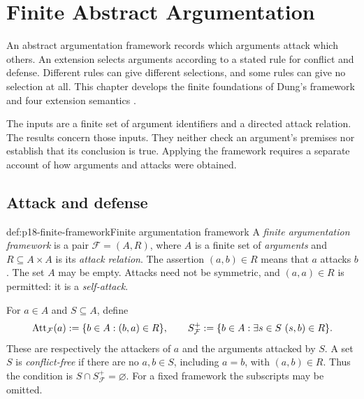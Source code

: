 \chapter{Finite Abstract Argumentation}
\label{sec:p18-finite-argumentation}

An abstract argumentation framework records which arguments attack which
others. An extension selects arguments according to a stated rule for
conflict and defense. Different rules can give different selections, and
some rules can give no selection at all. This chapter develops the finite
foundations of Dung's framework and four extension semantics
\cite[secs.~2.1--2.2, pp.~325--330]{Dung1995}.

The inputs are a finite set of argument identifiers and a directed attack
relation. The results concern those inputs. They neither check an argument's
premises nor establish that its conclusion is true. Applying the framework
requires a separate account of how arguments and attacks were obtained.

\section{Attack and defense}
\label{sec:p18-attack-defense}

\begin{hbdefinition}{def:p18-finite-framework}{Finite argumentation framework}
A \emph{finite argumentation framework} is a pair
\(\mathcal F=(A,R)\), where \(A\) is a finite set of
\emph{arguments} and \(R\subseteq A\times A\) is its \emph{attack
relation}. The assertion \((a,b)\in R\) means that \(a\) attacks
\(b\). The set \(A\) may be empty. Attacks need not be symmetric,
and \((a,a)\in R\) is permitted: it is a \emph{self-attack}.

For \(a\in A\) and \(S\subseteq A\), define
\[
 \operatorname{Att}_{\mathcal F}(a)\mathrel{:=}\{b\in A:(b,a)\in R\},
 \qquad
 S^+_{\mathcal F}\mathrel{:=}\{b\in A:\exists s\in S\ (s,b)\in R\}.
\]
These are respectively the attackers of \(a\) and the arguments attacked
by \(S\). A set \(S\) is \emph{conflict-free} if there are no
\(a,b\in S\), including \(a=b\), with \((a,b)\in R\).
Thus the condition is \(S\cap S^+_{\mathcal F}=\varnothing\).
For a fixed framework the subscripts may be omitted.
\end{hbdefinition}


